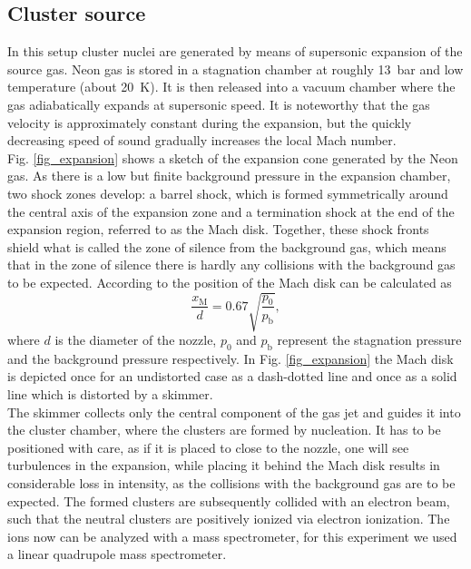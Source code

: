 \documentclass[a4paper,10pt]{article}
\begin{document}
\subsection{Cluster source} 
In this setup cluster nuclei are generated by means of supersonic expansion of the source gas. Neon gas is stored in a stagnation chamber at roughly \SI{13}{\bar} and low temperature (about \SI{20}{\K}). It is then released into a vacuum chamber where the gas adiabatically expands at supersonic speed. It is noteworthy that the gas velocity is approximately constant during the expansion, but the quickly decreasing speed of sound gradually increases the local Mach number. \\
Fig. \ref{fig_expansion} shows a sketch of the expansion cone generated by the Neon gas. As there is a low but finite background pressure in the expansion chamber, two shock zones develop: a barrel shock, which is formed symmetrically around the central axis of the expansion zone and a termination shock at the end of the expansion region, referred to as the Mach disk. Together, these shock fronts shield what is called the zone of silence from the background gas, which means that in the zone of silence there is hardly any collisions with the background gas to be expected. According to \cite{script} the position of the Mach disk can be calculated as 
\begin{equation}
	\frac{x_\mathrm{M}}{d} = 0.67 \sqrt{\frac{p_0}{p_\mathrm{b}}}, 
\end{equation}
where $d$ is the diameter of the nozzle, $p_0$ and $p_\mathrm{b}$ represent the stagnation pressure and the background pressure respectively. In Fig. \ref{fig_expansion} the Mach disk is depicted once for an undistorted case as a dash-dotted line and once as a solid line which is distorted by a skimmer. \\
The skimmer collects only the central component of the gas jet and guides it into the cluster chamber, where the clusters are formed by nucleation. It has to be positioned with care, as if it is placed to close to the nozzle, one will see turbulences in the expansion, while placing it behind the Mach disk results in considerable loss in intensity, as the collisions with the background gas are to be expected. The formed clusters are subsequently collided with an electron beam, such that the neutral clusters are positively ionized via electron ionization. The ions now can be analyzed with a mass spectrometer, for this experiment we used a linear quadrupole mass spectrometer.%
\end{document}
